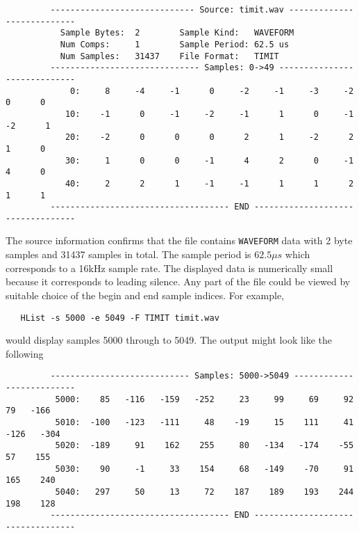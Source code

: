 \begin{list}{}{\setlength{\leftmargin}{-1cm}}
\item
\begin{verbatim}
         ----------------------------- Source: timit.wav ---------------------------
           Sample Bytes:  2        Sample Kind:   WAVEFORM
           Num Comps:     1        Sample Period: 62.5 us
           Num Samples:   31437    File Format:   TIMIT
         ------------------------------ Samples: 0->49 -----------------------------
             0:     8     -4     -1      0     -2     -1     -3     -2      0      0
            10:    -1      0     -1     -2     -1      1      0     -1     -2      1
            20:    -2      0      0      0      2      1     -2      2      1      0
            30:     1      0      0     -1      4      2      0     -1      4      0
            40:     2      2      1     -1     -1      1      1      2      1      1
         ------------------------------------ END ----------------------------------
\end{verbatim}
\end{list}
The source information confirms that the file contains \texttt{WAVEFORM}
data with 2 byte samples and 31437 samples in total.  The sample period is
$62.5\mu s$ which corresponds to a 16kHz sample rate.  
The displayed data is numerically small because it corresponds to leading silence.
Any part of the file could be viewed by suitable choice of the begin and end
sample indices. For example,
\begin{verbatim}
   HList -s 5000 -e 5049 -F TIMIT timit.wav
\end{verbatim}
would display samples 5000 through to 5049.  
The output might look like the following
\begin{list}{}{\setlength{\leftmargin}{-1cm}}
\item
\begin{verbatim}
         ---------------------------- Samples: 5000->5049 --------------------------
          5000:    85   -116   -159   -252     23     99     69     92     79   -166
          5010:  -100   -123   -111     48    -19     15    111     41   -126   -304
          5020:  -189     91    162    255     80   -134   -174    -55     57    155
          5030:    90     -1     33    154     68   -149    -70     91    165    240
          5040:   297     50     13     72    187    189    193    244    198    128
         ------------------------------------ END ----------------------------------
\end{verbatim}
\end{list}

